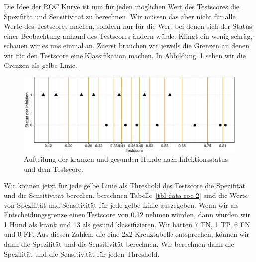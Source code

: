 \documentclass[
  letterpaper,
]{scrbook}
\begin{document}
Die Idee der ROC Kurve ist nun für jeden möglichen Wert des Testscores
die Spezifität und Sensitivität zu berechnen. Wir müssen das aber nicht
für alle Werte des Testscores machen, sondern nur für die Wert bei denen
sich der Status einer Beobachtung anhand des Testscores ändern würde.
Klingt ein wenig schräg, schauen wir es uns einmal an. Zuerst brauchen
wir jeweils die Grenzen an denen wir für den Testscore eine
Klassifikation machen. In Abbildung~\ref{fig-labels-roc3} sehen wir die
Grenzen als gelbe Linie.

\begin{figure}

{\centering \includegraphics{./stat-tests-diagnostic_files/figure-pdf/fig-labels-roc3-1.pdf}

}

\caption{\label{fig-labels-roc3}Aufteilung der kranken und gesunden
Hunde nach Infektionsstatus und dem Testscore.}

\end{figure}

Wir können jetzt für jede gelbe Linie als Threshold des Testscore die
Spezifität und die Sensitivität berechen. berechnen
Tabelle~\ref{tbl-data-roc-2} sind die Werte von Spezifität und
Sensitivität für jede gelbe Linie ausgegeben. Wenn wir als
Entscheidungsgrenze einen Testscore von 0.12 nehmen würden, dann würden
wir 1 Hund als krank und 13 als gesund klassifizieren. Wir hätten 7 TN,
1 TP, 6 FN und 0 FP. Aus diesen Zahlen, die eine 2x2 Kreuztabelle
entsprechen, können wir dann die Spezifität und die Sensitivität
berechnen. Wir berechnen dann die Spezifität und die Sensitivität für
jeden Threshold.
\end{document}
